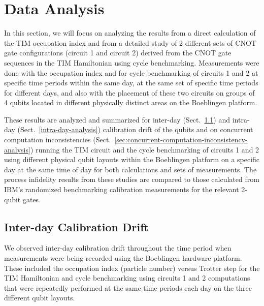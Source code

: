   
\section{Data Analysis}
\label{sec:data-analysis}


In this section, we will focus on analyzing the results from a direct calculation of the TIM occupation index and from a detailed study of 2 different sets of CNOT gate configurations (circuit 1 and circuit 2) derived from the CNOT gate sequences in the TIM Hamiltonian using cycle benchmarking. Measurements were done with the occupation index and for cycle benchmarking of circuits 1 and 2 at specific time periods within the same day, at the same set of specific time periods for different days, and also with the placement of these two circuits on groups of 4 qubits located in different physically distinct areas on the Boeblingen platform. 

These results are analyzed and summarized for inter-day (Sect.~\ref{inter-day-analysis}) and intra-day (Sect.~\ref{intra-day-analysis}) calibration drift of the qubits and on concurrent computation inconsistencies (Sect.~\ref{sec:concurrent-computation-inconsistency-analysis}) running the TIM circuit and the cycle benchmarking of circuits 1 and 2 using different physical qubit layouts within the Boeblingen platform on a specific day at the same time of day for both calculations and sets of measurements.  The process infidelity results from these studies are compared to those calculated from IBM's randomized benchmarking calibration measurements for the relevant 2-qubit gates. 


\subsection{Inter-day Calibration Drift}
\label{inter-day-analysis}


We observed inter-day calibration drift throughout the time period when measurements were being recorded using the Boeblingen hardware platform.  These included the occupation index (particle number) versus Trotter step for the TIM Hamiltonian and cycle benchmarking using circuits 1 and 2 computations that were repeatedly performed at the same time periods each day on the three different qubit layouts.  

